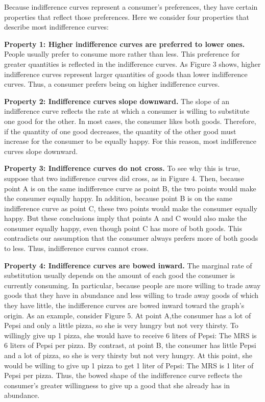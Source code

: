 Because indifference curves represent a consumer's preferences, they have certain properties that reflect those
preferences. Here we consider four properties that describe most indifference curves:
\bit
\item \textbf{Property 1: Higher indifference curves are preferred to lower ones.}
People usually prefer to consume more rather than less. This preference for greater quantities is reflected in the
indifference curves. As Figure 3 shows, higher indifference curves represent larger quantities of goods than lower
indifference curves. Thus, a consumer prefers being on higher indifference curves.
\item \textbf{Property 2: Indifference curves slope downward.}
The slope of an indifference curve reflects the rate at which a consumer is willing to substitute one good for the
other. In most cases, the consumer likes both goods. Therefore, if the quantity of one good decreases, the quantity
of the other good must increase for the consumer to be equally happy. For this reason, most indifference curves slope
downward.
\item \textbf{Property 3: Indifference curves do not cross.}
To see why this is true, suppose that two indifference curves did cross, as in Figure 4. Then, because point A is on
the same indifference curve as point B, the two points would make the consumer equally happy. In addition, because
point B is on the same indifference curve as point C, these two points would make the consumer equally happy. But
these conclusions imply that points A and C would also make the consumer equally happy, even though point C has more
of both goods. This contradicts our assumption that the consumer always prefers more of both goods to less. Thus,
indifference curves cannot cross.


\item \textbf{Property 4: Indifference curves are bowed inward.}
The marginal rate of substitution usually depends on the amount of each good the consumer is currently consuming. In
particular, because people are more willing to trade away goods that they have in abundance and less willing to trade
away goods of which they have little, the indifference curves are bowed inward toward the graph's origin. As an
example, consider Figure 5. At point A,the consumer has a lot of Pepsi and only a little pizza, so she is very hungry
but not very thirsty. To willingly give up 1 pizza, she would have to receive 6 liters of Pepsi: The MRS is 6 liters
of Pepsi per pizza. By contrast, at point B, the consumer has little Pepsi and a lot of pizza, so she is very thirsty
but not very hungry. At this point, she would be willing to give up 1 pizza to get 1 liter of Pepsi: The MRS is 1
liter of Pepsi per pizza. Thus, the bowed shape of the indifference curve reflects the consumer's greater willingness
to give up a good that she already has in abundance.


